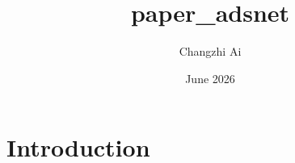 \documentclass{article}
\title{paper_adsnet}
\author{Changzhi Ai}
\date{June 2026}
\begin{document}
\maketitle

\section{Introduction}
\end{document}
